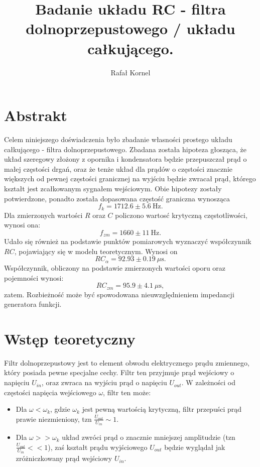 \documentclass[10pt,a4paper]{article}
\author{Rafał Kornel}
\title{\textbf{Badanie układu RC - filtra dolnoprzepustowego / układu całkującego.}}
\date{}
\begin{document}
\maketitle

\section*{Abstrakt}
Celem niniejszego doświadczenia było zbadanie własności prostego układu całkującego - 
filtra dolnoprzepustowego. Zbadana została hipoteza głosząca, że układ szeregowy 
złożony z opornika i kondensatora będzie przepuszczał prąd o małej częstości 
drgań, oraz że tenże układ dla prądów o częstości znacznie większych od pewnej 
częstości granicznej na wyjściu będzie zwracał prąd, którego kształt jest zcałkowanym
sygnałem wejściowym. Obie hipotezy zostały potwierdzone, ponadto została dopasowana
częstość graniczna wynosząca 
$$ f_k = 1712.6 \pm 5.6 \ \text{Hz}. $$ Dla zmierzonych wartości $R$ oraz $C$ policzono wartosć krytyczną częstotliwości, wynosi ona:
$$ f_{zm} = 1660 \pm 11 \ \text{Hz}.$$ Udało się również na podstawie punktów pomiarowych wyznaczyć
współczynnik $RC$, pojawiający się w modelu teoretycznym. Wynosi on
$$ RC_{\alpha} = 92.93 \pm 0.19 \ \mu \text{s}. $$
Współczynnik, obliczony na podstawie zmierzonych wartości oporu oraz pojemności wynosi:
$$ RC_{zm} = 95.9 \pm 4.1 \ \mu \text{s}, $$
zatem. Rozbieżność może być spowodowana nieuwzględnieniem impedancji 
generatora funkcji.
	
\section*{Wstęp teoretyczny}
Filtr dolnoprzepustowy jest to element obwodu elektrycznego prądu zmiennego, który posiada pewne specjalne cechy. Filtr ten przyjmuje prąd wejściowy o napięciu $U_{in}$, oraz zwraca na wyjściu prąd o napięciu $U_{out}$. W zależności od częstości napięcia wejściowego $\omega$, filtr ten może:
\begin{itemize}
\item Dla  $\omega < \omega_k$, gdzie $\omega_k$ jest pewną wartością krytyczną, filtr przepuści prąd prawie niezmieniony, tzn $\frac{U_{out}}{U_{in}} \sim 1$.
\item Dla $\omega >> \omega_k$ układ zwróci prąd o znacznie mniejszej amplitudzie (tzn $\frac{U_{out}}{U_{in}} << 1$), zaś kształt prądu wyjściowego $U_{out}$ będzie wyglądał jak zróżniczkowany prąd wejściowy $U_{in}$.
\end{itemize}
\end{document}
